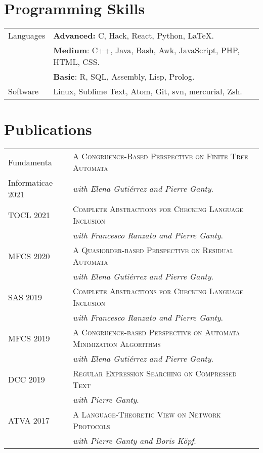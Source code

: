 \documentclass[a4paper,10pt]{article} %
\begin{document}
\section{Programming Skills}
\begin{tabular}{p{2.5cm}p{13.2cm}}
\small{Languages} & \textcolor{azureblue}{\textbf{Advanced:}} C, Hack, React, Python, \LaTeX.\\
[1pt]
& \textcolor{battleshipgrey}{\textbf{Medium}}: C++, Java, Bash, Awk, JavaScript, PHP, HTML, CSS.\\
& \textbf{Basic}: R, SQL, Assembly, Lisp, Prolog.\\
[3pt]
\small{Software} & Linux, Sublime Text, Atom, Git, svn, mercurial, Zsh.\\
\end{tabular}

\section{Publications}
\begin{tabular}{p{2.5cm}p{13.2cm}}
\small{Fundamenta} & \textsc{A Congruence-Based Perspective on Finite Tree Automata} \\
\small{Informaticae 2021} & \textit{with Elena Gutiérrez and Pierre Ganty}. \\
[3pt]
\small{TOCL 2021} & \textsc{Complete Abstractions for Checking Language Inclusion} \\
& \textit{with Francesco Ranzato and Pierre Ganty}. \\
[3pt]
\small{MFCS 2020} & \textsc{A Quasiorder-based Perspective on Residual Automata} \\
& \textit{with Elena Gutiérrez and Pierre Ganty}. \\
[3pt]
\small{SAS 2019} & \textsc{Complete Abstractions for Checking Language Inclusion} \\
& \textit{with Francesco Ranzato and Pierre Ganty}. \\
[3pt]
\small{MFCS 2019} & \textsc{A Congruence-based Perspective on Automata Minimization Algorithms} \\
 & \textit{with Elena Gutiérrez and Pierre Ganty}. \\
[3pt]
\small{DCC 2019} & \textsc{Regular Expression Searching on Compressed Text} \\
 & \textit{with Pierre Ganty}. \\
[3pt]
\small{ATVA 2017} & \textsc{A Language-Theoretic View on Network Protocols} \\
& \textit{with Pierre Ganty and Boris Köpf}. \\
\end{tabular}
\end{document}
